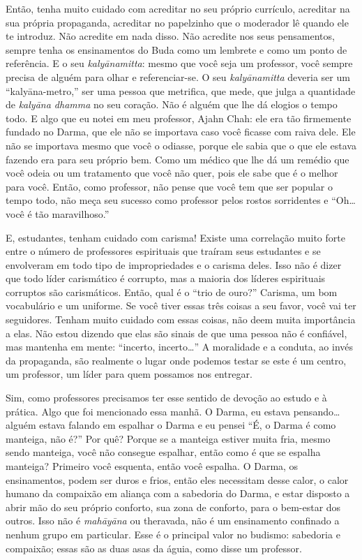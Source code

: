 Então, tenha muito cuidado com acreditar no seu próprio currículo,
acreditar na sua própria propaganda, acreditar no papelzinho que o
moderador lê quando ele te introduz. Não acredite em nada disso. Não
acredite nos seus pensamentos, sempre tenha os ensinamentos do Buda
como um lembrete e como um ponto de referência. E o seu
\textit{kalyānamitta}: mesmo que você seja um professor, você sempre
precisa de alguém para olhar e referenciar-se. O seu
\textit{kalyānamitta} deveria ser um “kalyāna-metro,” ser uma
pessoa que metrifica, que mede, que julga a quantidade de
\textit{kalyāna dhamma} no seu coração. Não é alguém que lhe dá
elogios o tempo todo. E algo que eu notei em meu professor, Ajahn Chah:
ele era tão firmemente fundado no Darma, que ele não se importava caso
você ficasse com raiva dele. Ele não se importava mesmo que você o
odiasse, porque ele sabia que o que ele estava fazendo era para seu
próprio bem. Como um médico que lhe dá um remédio que você odeia ou um
tratamento que você não quer, pois ele sabe que é o melhor para você.
Então, como professor, não pense que você tem que ser popular o tempo
todo, não meça seu sucesso como professor pelos rostos sorridentes e
“Oh\ldots{} você é tão maravilhoso.” 

E, estudantes, tenham cuidado com carisma! Existe uma correlação
muito forte entre o número de professores espirituais que traíram seus
estudantes e se envolveram em todo tipo de impropriedades e o carisma
deles. Isso não é dizer que todo líder carismático é corrupto, mas a
maioria dos líderes espirituais corruptos são carismáticos. Então, qual
é o “trio de ouro?” Carisma, um bom vocabulário e um uniforme. Se você
tiver essas três coisas a seu favor, você vai ter seguidores. Tenham
muito cuidado com essas coisas, não deem muita importância a elas. Não
estou dizendo que elas são sinais de que uma pessoa não é confiável,
mas mantenha em mente: “incerto, incerto\ldots{}” A moralidade e a conduta, ao
invés da propaganda, são realmente o lugar onde podemos testar se este
é um centro, um professor, um líder para quem possamos nos entregar. 

Sim, como professores precisamos ter esse sentido de devoção ao
estudo e à prática. Algo que foi mencionado essa manhã. O Darma, eu
estava pensando\ldots{} alguém estava falando em espalhar o Darma e eu pensei
“É, o Darma é como manteiga, não é?” Por quê? Porque se a manteiga
estiver muita fria, mesmo sendo manteiga, você não consegue espalhar,
então como é que se espalha manteiga? Primeiro você esquenta, então
você espalha. O Darma, os ensinamentos, podem ser duros e frios, então
eles necessitam desse calor, o calor humano da compaixão em aliança com
a sabedoria do Darma, e estar disposto a abrir mão do seu próprio
conforto, sua zona de conforto, para o bem-estar dos outros. Isso não é
\textit{mahāyāna} ou theravada, não é um ensinamento confinado a
nenhum grupo em particular. Esse é o principal valor no budismo:
sabedoria e compaixão; essas são as duas asas da águia, como disse um
professor. 

